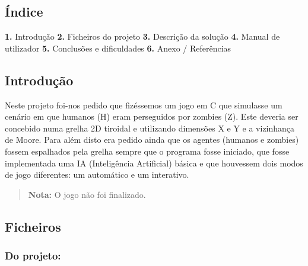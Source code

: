\subsection*{Índice}

{\bfseries 1.} Introdução {\bfseries 2.} Ficheiros do projeto {\bfseries 3.} Descrição da solução {\bfseries 4.} Manual de utilizador {\bfseries 5.} Conclusões e dificuldades {\bfseries 6.} Anexo / Referências

\subsection*{Introdução}

Neste projeto foi-\/nos pedido que fizéssemos um jogo em C que simulasse um cenário em que humanos (H) eram perseguidos por zombies (Z). Este deveria ser concebido numa grelha 2D tiroidal e utilizando dimensões X e Y e a vizinhança de Moore. Para além disto era pedido ainda que os agentes (humanos e zombies) fossem espalhados pela grelha sempre que o programa fosse iniciado, que fosse implementada uma IA (Inteligência Artificial) básica e que houvessem dois modos de jogo diferentes\+: um automático e um interativo.

\begin{quote}
{\bfseries Nota\+:} O jogo não foi finalizado. \end{quote}


\subsection*{Ficheiros}

\subsubsection*{Do projeto\+:}


